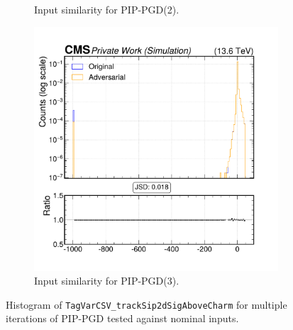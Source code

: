 \begin{figure}[h]
\begin{subfigure}[t]{0.32\textwidth}
    \caption*{Input similarity for PIP-PGD(2).}
  \end{subfigure}\hfill
  \begin{subfigure}[t]{0.32\textwidth}
    \includegraphics[width=\linewidth]{media/output/features/compare/combined_it_3/cmp_global_features_TagVarCSV_trackSip2dSigAboveCharm.pdf}
    \caption*{Input similarity for PIP-PGD(3).}
  \end{subfigure}

  \caption*{Histogram of \texttt{TagVarCSV\_trackSip2dSigAboveCharm} for multiple iterations of PIP-PGD tested against nominal inputs.}
  \label{fig:combined_input_TagVarCSV_trackSip2dSigAboveCharm}
\end{figure}

